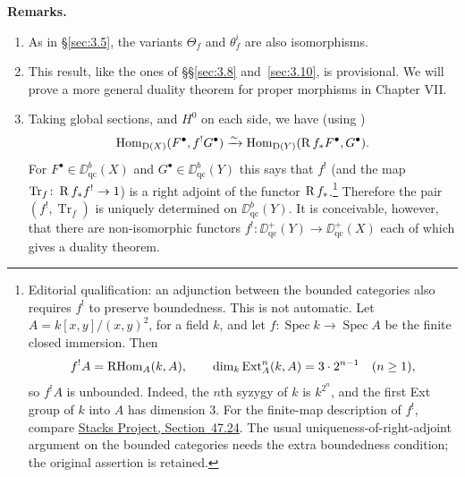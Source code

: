 \textbf{Remarks.}
\begin{enumerate}
\item As in \S\ref{sec:3.5}, the variants $\Theta_f$ and $\theta_f^i$ are also isomorphisms.
\item This result, like the ones of \S\S\ref{sec:3.8} and~\ref{sec:3.10}, is provisional. We will prove a more general duality theorem for proper morphisms in Chapter VII.
\item Taking global sections, and $H^0$ on each side, we have (using )
\[
\operatorname{Hom}_{\operatorname{D}(X)}(F^\bullet,f^!G^\bullet) \xrightarrow{\sim} \operatorname{Hom}_{\operatorname{D}(Y)}(\operatorname{R} f_*F^\bullet,G^\bullet).
\]
For $F^\bullet\in\DD_{\mathrm{qc}}^b(X)$ and $G^\bullet\in\DD_{\mathrm{qc}}^b(Y)$ this says that $f^!$ (and the map $\operatorname{Tr}_f\colon \operatorname{R} f_* f^!\to 1$) is a right adjoint of the functor $\operatorname{R} f_*$.\footnote{Editorial qualification: an adjunction between the bounded categories also requires $f^!$ to preserve boundedness. This is not automatic. Let $A=k[x,y]/(x,y)^2$, for a field $k$, and let $f\colon\operatorname{Spec}k\to\operatorname{Spec}A$ be the finite closed immersion. Then
\[
f^!A=\operatorname{RHom}_A(k,A),\qquad
\dim_k\operatorname{Ext}_A^n(k,A)=3\cdot2^{n-1}\quad(n\geq1),
\]
so $f^!A$ is unbounded. Indeed, the $n$th syzygy of $k$ is $k^{2^n}$, and the first Ext group of $k$ into $A$ has dimension $3$. For the finite-map description of $f^!$, compare \href{https://stacks.math.columbia.edu/tag/0BZI}{Stacks Project, Section~47.24}. The usual uniqueness-of-right-adjoint argument on the bounded categories needs the extra boundedness condition; the original assertion is retained.} Therefore the pair $(f^!,\operatorname{Tr}_f)$ is uniquely determined on $\DD_{\mathrm{qc}}^b(Y)$. It is conceivable, however, that there are non-isomorphic functors $f^!\colon\DD_{\mathrm{qc}}^+(Y)\to\DD_{\mathrm{qc}}^+(X)$ each of which gives a duality theorem.
\end{enumerate}

